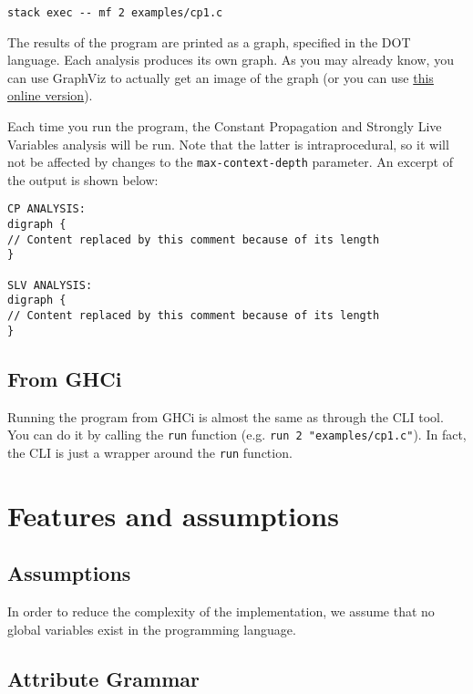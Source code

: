 \documentclass{article}
\begin{document}
\begin{verbatim}
stack exec -- mf 2 examples/cp1.c
\end{verbatim}

The results of the program are printed as a graph, specified in the DOT language.
Each analysis produces its own graph.
As you may already know, you can use GraphViz to actually get an image of the graph (or you can use \href{http://www.webgraphviz.com/}{this online version}).

Each time you run the program, the Constant Propagation and Strongly Live Variables analysis will be run.
Note that the latter is intraprocedural, so it will not be affected by changes to the \texttt{max-context-depth} parameter.
An excerpt of the output is shown below:

\begin{verbatim}
CP ANALYSIS:
digraph {
// Content replaced by this comment because of its length
}

SLV ANALYSIS:
digraph {
// Content replaced by this comment because of its length
}
\end{verbatim}

\subsection*{From GHCi}

Running the program from GHCi is almost the same as through the CLI tool. You can do it by calling the \texttt{run} function (e.g. \texttt{run 2 "examples/cp1.c"}). In fact, the CLI is just a wrapper around the \texttt{run} function.

\section{Features and assumptions}


\subsection*{Assumptions}

In order to reduce the complexity of the implementation, we assume that no global variables exist in the programming language.

\subsection*{Attribute Grammar}
\end{document}

